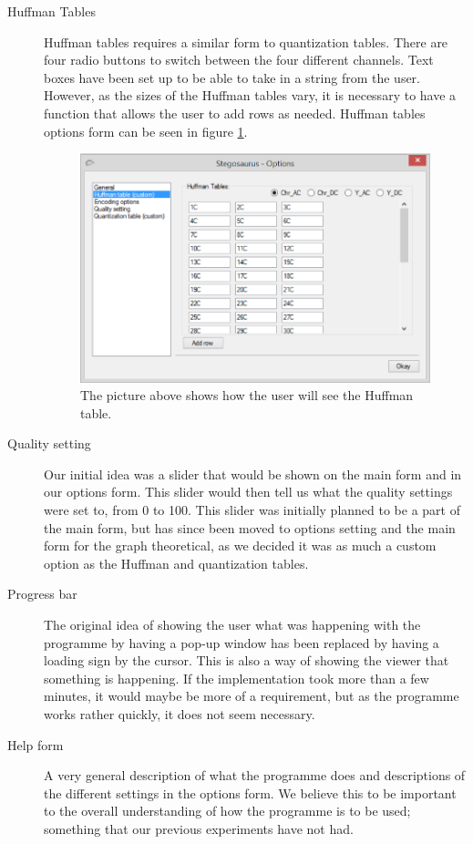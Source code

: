 \begin{description}
\item[Huffman Tables]

Huffman tables requires a similar form to quantization tables. There are four radio buttons to switch between the four different channels. Text boxes have been set up to be able to take in a string from the user. However, as the sizes of the Huffman tables vary, it is necessary to have a function that allows the user to add rows as needed. Huffman tables options form can be seen in figure \ref{fig:StegoOptionHuff}.


\begin{figure}
	\centering
	\includegraphics[width=1\textwidth]{figures/StegoOptionHuff.png}
	\caption{The picture above shows how the user will see the Huffman table.}
	\label{fig:StegoOptionHuff}
\end{figure}

\item[Quality setting]
Our initial idea was a slider that would be shown on the main form and in our options form.
This slider would then tell us what the quality settings were set to, from 0 to 100.
This slider was initially planned to be a part of the main form, but has since been moved to options setting and the main form for the graph theoretical, as we decided it was as much a custom option as the Huffman and quantization tables.

\item[Progress bar]
The original idea of showing the user what was happening with the programme by having a pop-up window has been replaced by having a loading sign by the cursor.
This is also a way of showing the viewer that something is happening.
If the implementation took more than a few minutes, it would maybe be more of a requirement, but as the programme works rather quickly, it does not seem necessary.

\item[Help form]
A very general description of what the programme does and descriptions of the different settings in the options form.
We believe this to be important to the overall understanding of how the programme is to be used; something that our previous experiments have not had.
\end{description}

